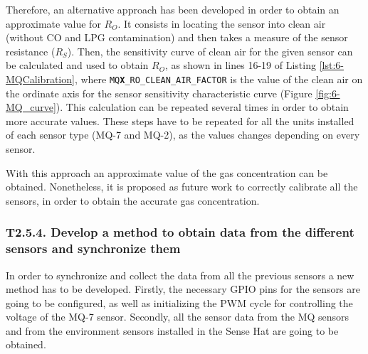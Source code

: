 Therefore, an alternative approach has been developed in order to obtain an approximate value for ${R}_{O}$. It consists in locating the sensor into clean air (without CO and LPG contamination) and then takes a measure of the sensor resistance (${R}_{S}$). Then, the sensitivity curve of clean air for the given sensor can be calculated and used to obtain ${R}_{O}$, as shown in lines 16-19 of Listing \ref{lst:6-MQCalibration}, where \texttt{MQ\textbf{X}\_RO\_CLEAN\_AIR\_FACTOR} is the value of the clean air on the ordinate axis for the sensor sensitivity characteristic curve (Figure \ref{fig:6-MQ_curve}). This calculation can be repeated several times in order to obtain more accurate values. These steps have to be repeated for all the units installed of each sensor type (MQ-7 and MQ-2), as the values changes depending on every sensor.



With this approach an approximate value of the gas concentration can be obtained. Nonetheless, it is proposed as future work to correctly calibrate all the sensors, in order to obtain the accurate gas concentration.


\subsubsection{T2.5.4. Develop a method to obtain data from the different sensors and synchronize them}

In order to synchronize and collect the data from all the previous sensors a new method has to be developed. Firstly, the necessary GPIO pins for the sensors are going to be configured, as well as initializing the \ac{PWM} cycle for controlling the voltage of the MQ-7 sensor. Secondly, all the sensor data from the MQ sensors and from the environment sensors installed in the Sense Hat \cite{SenseHAT} are going to be obtained.

